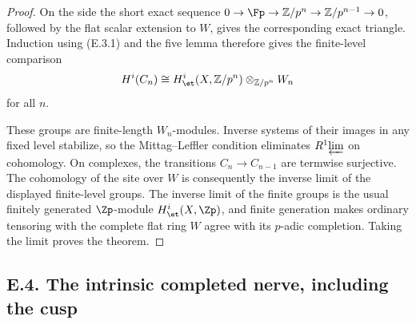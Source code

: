 \begin{proof}
On the \etale side the short exact sequence
$0\to\Fp\to\mathbb Z/p^n\to\mathbb Z/p^{n-1}\to0$, followed by the flat scalar extension to $W$, gives the corresponding exact triangle.  Induction using (E.3.1) and the five lemma therefore gives the finite-level comparison
\[
 H^i(C_n)\cong H^i_{\et}(X,\mathbb Z/p^n)\otimes_{\mathbb Z/p^n}W_n
\]
for all $n$.

These groups are finite-length $W_n$-modules.  Inverse systems of their images in any fixed level stabilize, so the Mittag--Leffler condition eliminates $R^1\!\varprojlim$ on cohomology.  On complexes, the transitions $C_n\to C_{n-1}$ are termwise surjective.  The cohomology of the site over $W$ is consequently the inverse limit of the displayed finite-level groups.  The inverse limit of the finite \etale groups is the usual finitely generated $\Zp$-module $H^i_{\et}(X,\Zp)$, and finite generation makes ordinary tensoring with the complete flat ring $W$ agree with its $p$-adic completion.  Taking the limit proves the theorem.
\end{proof}

\subsection{E.4. The intrinsic completed nerve, including the cusp}

